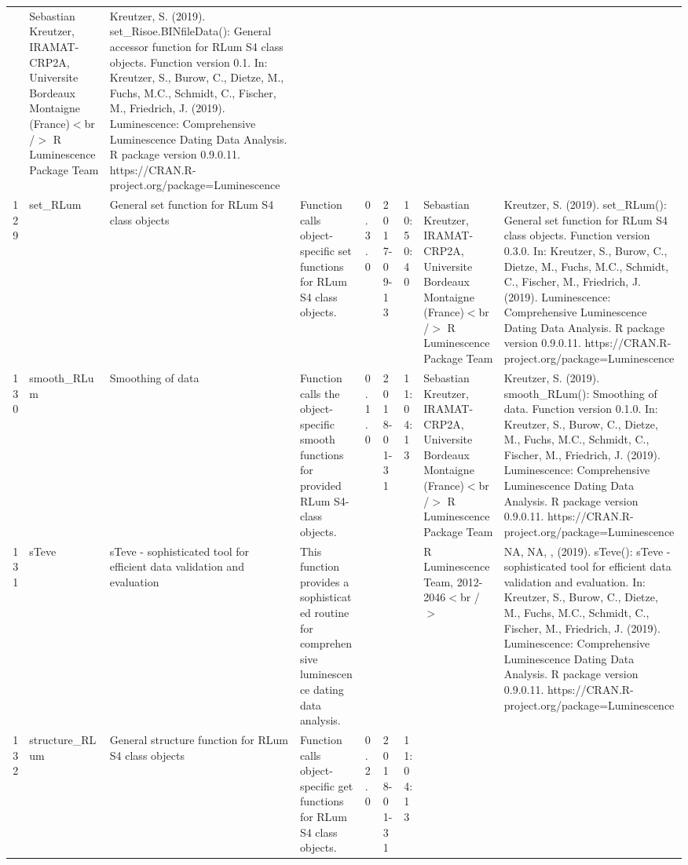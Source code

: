 \begin{table}[ht]
\begin{tabular}{rllllllll}
 & Sebastian Kreutzer, IRAMAT-CRP2A, Universite Bordeaux Montaigne (France)$<$br /$>$  R Luminescence Package Team & Kreutzer, S. (2019). set\_Risoe.BINfileData(): General accessor function for RLum S4 class objects. Function version 0.1. In: Kreutzer, S., Burow, C., Dietze, M., Fuchs, M.C., Schmidt, C., Fischer, M., Friedrich, J. (2019). Luminescence: Comprehensive Luminescence Dating Data Analysis. R package version 0.9.0.11. https://CRAN.R-project.org/package=Luminescence
 \\ 
  129 & set\_RLum & General set function for RLum S4 class objects & Function calls object-specific set functions for RLum S4 class objects. & 0.3.0 & 2017-09-13 & 10:50:40
 & Sebastian Kreutzer, IRAMAT-CRP2A, Universite Bordeaux Montaigne (France)$<$br /$>$  R Luminescence Package Team & Kreutzer, S. (2019). set\_RLum(): General set function for RLum S4 class objects. Function version 0.3.0. In: Kreutzer, S., Burow, C., Dietze, M., Fuchs, M.C., Schmidt, C., Fischer, M., Friedrich, J. (2019). Luminescence: Comprehensive Luminescence Dating Data Analysis. R package version 0.9.0.11. https://CRAN.R-project.org/package=Luminescence
 \\ 
  130 & smooth\_RLum & Smoothing of data & Function calls the object-specific smooth functions for provided RLum S4-class objects. & 0.1.0 & 2018-01-31 & 11:04:13
 & Sebastian Kreutzer, IRAMAT-CRP2A, Universite Bordeaux Montaigne (France)$<$br /$>$  R Luminescence Package Team & Kreutzer, S. (2019). smooth\_RLum(): Smoothing of data. Function version 0.1.0. In: Kreutzer, S., Burow, C., Dietze, M., Fuchs, M.C., Schmidt, C., Fischer, M., Friedrich, J. (2019). Luminescence: Comprehensive Luminescence Dating Data Analysis. R package version 0.9.0.11. https://CRAN.R-project.org/package=Luminescence
 \\ 
  131 & sTeve & sTeve - sophisticated tool for efficient data validation and evaluation & This function provides a sophisticated routine for comprehensive luminescence dating data analysis. &  &  &  & R Luminescence Team, 2012-2046$<$br /$>$ & NA, NA, ,  (2019). sTeve(): sTeve - sophisticated tool for efficient data validation and evaluation. In: Kreutzer, S., Burow, C., Dietze, M., Fuchs, M.C., Schmidt, C., Fischer, M., Friedrich, J. (2019). Luminescence: Comprehensive Luminescence Dating Data Analysis. R package version 0.9.0.11. https://CRAN.R-project.org/package=Luminescence
 \\ 
  132 & structure\_RLum & General structure function for RLum S4 class objects & Function calls object-specific get functions for RLum S4 class objects. & 0.2.0 & 2018-01-31 & 11:04:13

\end{tabular}
\end{table}
